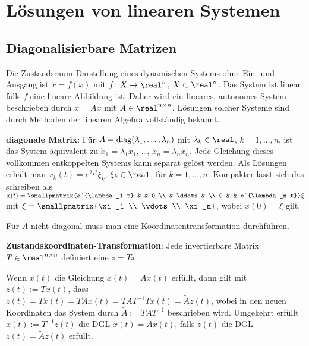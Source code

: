 \section{%
    Lösungen von linearen Systemen%
}

\subsection{%
    Diagonalisierbare Matrizen%
}

Die Zustandsraum-Darstellung eines dynamischen Systems ohne Ein- und Ausgang ist
$\dot{x} = f(x)$ mit $f\colon X \rightarrow \real^n$, $X \subset \real^n$.
Das System ist linear, falls $f$ eine lineare Abbildung ist.
Daher wird ein lineares, autonomes System beschrieben durch $\dot{x} = Ax$ mit
$A \in \real^{n \times n}$.
Lösungen solcher Systeme sind durch Methoden der linearen Algebra vollständig bekannt.

\linie

\textbf{diagonale Matrix}:
Für $A = \operatorname{diag}(\lambda_1, \dotsc, \lambda_n)$ mit $\lambda_k \in \real$, $k = 1, \dotsc, n$,
ist das System äquivalent zu $\dot{x}_1 = \lambda_1 x_1$, \dots, $\dot{x}_n = \lambda_n x_n$.
Jede Gleichung dieses vollkommen entkoppelten Systems kann separat gelöst werden.
Als Lösungen erhält man $x_k(t) = e^{\lambda_k t} \xi_k$, $\xi_k \in \real$, für
$k = 1, \dotsc, n$.
Kompakter lässt sich das schreiben als
$x(t) = \smallpmatrix{e^{\lambda_1 t} & & 0 \\ & \ddots & \\ 0 & & e^{\lambda_n t}} \xi$ mit
$\xi = \smallpmatrix{\xi_1 \\ \vdots \\ \xi_n}$, wobei $x(0) = \xi$ gilt.

\linie

Für $A$ nicht diagonal muss man eine Koordinatentransformation durchführen.

\textbf{Zustandskoordinaten-Transformation}:
Jede invertierbare Matrix $T \in \real^{n \times n}$ definiert eine
 $z = Tx$.

Wenn $x(t)$ die Gleichung $\dot{x}(t) = Ax(t)$ erfüllt, dann gilt mit $z(t) := Tx(t)$, dass\\
$\dot{z}(t) = T\dot{x}(t) = TAx(t) = TAT^{-1} Tx(t) = \widetilde{A} z(t)$,
wobei in den neuen Koordinaten das System durch $\widetilde{A} := TAT^{-1}$ beschrieben wird.
Umgekehrt erfüllt $x(t) := T^{-1} z(t)$ die DGL $\dot{x}(t) = Ax(t)$, falls
$z(t)$ die DGL $\widetilde{z}(t) = \widetilde{A} z(t)$ erfüllt.

